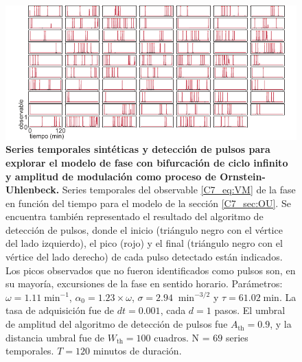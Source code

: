 \documentclass[./main.tex]{subfiles}
\begin{document}
\begin{subappendices}
\begin{figure}
    \centering
    \includegraphics[width=1\columnwidth]{figures/chapter7/C7_OU_traces_for_evaluation_VM.pdf} 
    \caption{\textbf{Series temporales sintéticas y detección de pulsos para explorar el modelo de fase con bifurcación de ciclo infinito y amplitud de modulación como proceso de Ornstein-Uhlenbeck.} Series temporales del observable \ref{C7_eq:VM} de la fase en función del tiempo para el modelo de la sección \ref{C7_sec:OU}. Se encuentra también representado el resultado del algoritmo de detección de pulsos, donde el inicio (triángulo negro con el vértice del lado izquierdo), el pico (rojo) y el final (triángulo negro con el vértice del lado derecho) de cada pulso detectado están indicados. Los picos observados que no fueron identificados como pulsos son, en su mayoría, excursiones de la fase en sentido horario. Parámetros: $\omega = 1.11\;\text{min}^{-1}$, $\alpha_0 = 1.23 \times \omega$, $ \sigma = 2.94 \; \;\text{min}^{-3/2}$ y $\tau = 61.02 \; \text{min} $. La tasa de adquisición fue de $dt = 0.001$, cada $d = 1$ pasos. El umbral de amplitud del algoritmo de detección de pulsos fue $A_{\text{th}} = 0.9$, y la distancia umbral fue de $W_{\text{th}} = 100\text{ cuadros}$. N = $69$ series temporales. $T = 120$ minutos de duración.}
    \label{C7_fig:OU_traces_VM}
\end{figure}


\end{subappendices}
\end{document}
